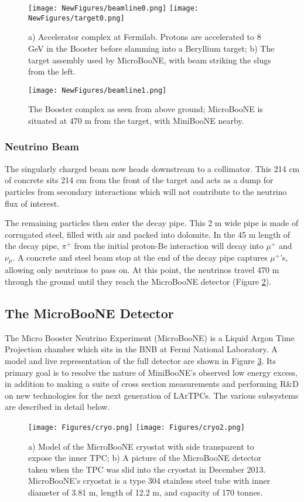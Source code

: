\documentclass[12pt]{article}
\begin{document}
\begin{figure}[h!]
\texttt{[image: NewFigures/beamline0.png]}
\hspace{3 mm}
\texttt{[image: NewFigures/target0.png]}
\caption{ a) Accelerator complex at Fermilab. Protons are accelerated to 8 GeV in the Booster before slamming into a Beryllium target; b) The target assembly used by MicroBooNE, with beam striking the slugs from the left. } 
\label{fig:beamline0}
\end{figure}

\begin{figure}[h!]
\centering
\texttt{[image: NewFigures/beamline1.png]}
\caption{ The Booster complex as seen from above ground; MicroBooNE is situated at 470 m from the target, with MiniBooNE nearby. }
\label{fig:beamline1}
\end{figure}

\subsubsection{Neutrino Beam}
\par The singularly charged beam now heads downstream to a collimator.  This 214 cm of concrete sits 214 cm from the front of the target and acts as a dump for particles from secondary interactions which will not contribute to the neutrino flux of interest. 
\par The remaining particles then enter the decay pipe.  This 2 m wide pipe is made of corrugated steel, filled with air and packed into dolomite. In the 45 m length of the decay pipe, $\pi^+$ from the initial proton-Be interaction will decay into $\mu^+$ and $\nu_\mu$.  A concrete and steel beam stop at the end of the decay pipe captures $\mu^+$'s, allowing only neutrinos to pass on.  At this point, the neutrinos travel 470 m through the ground until they reach the MicroBooNE detector (Figure \ref{fig:beamline1}).

\subsection{The MicroBooNE Detector}
The Micro Booster Neutrino Experiment (MicroBooNE) is a Liquid Argon Time Projection chamber which sits in the BNB at Fermi National Laboratory. A model and live representation of the full detector are shown in Figure \ref{fig:cryo2}. Its primary goal is to resolve the nature of MiniBooNE's observed low energy excess, in addition to making a suite of cross section measurements and performing R\&D on new technologies for the next generation of LArTPCs. The various subsystems are described in detail below.
\begin{figure}[H]
\centering
\texttt{[image: Figures/cryo.png]}
\hspace{4 mm}
\texttt{[image: Figures/cryo2.png]}
\caption{a) Model of the MicroBooNE cryostat with side transparent to expose the inner TPC; b) A picture of the MicroBooNE detector taken when the TPC was slid into the cryostat in December 2013.  MicroBooNE's cryostat is a type 304 stainless steel tube with inner diameter of 3.81 m, length of 12.2 m, and capacity of 170 tonnes. }
\label{fig:cryo2}
\end{figure}
\end{document}
